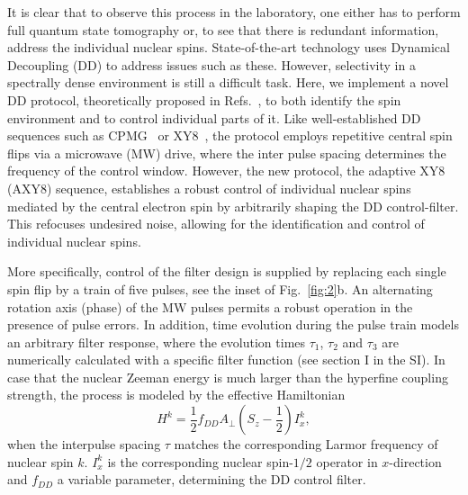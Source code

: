 \documentclass[aps,prl,floatfix,twocolumn,footinbib,superscriptaddress]{revtex4-1}
\begin{document}
It is clear that to observe this process in the laboratory, one either has to perform full quantum state tomography or, to see that there is redundant information, address the individual nuclear spins. State-of-the-art technology uses Dynamical Decoupling (DD) to address issues such as these. However, selectivity in a spectrally dense environment is still a difficult task. Here, we implement a novel DD protocol, theoretically proposed in Refs.~\cite{Cas2015,Cas17}, to both identify the spin environment and to control individual parts of it. Like well-established DD sequences such as CPMG~\cite{MAUDSLEY1986488} or XY8~\cite{gull90}, the protocol employs repetitive central spin flips via a microwave (MW) drive, where the inter pulse spacing determines the frequency of the control window. However, the new protocol, the adaptive XY8 (AXY8) sequence, establishes a robust control of individual nuclear spins mediated by the central electron spin by arbitrarily shaping the DD control-filter. This refocuses undesired noise, allowing for the identification and control of individual nuclear spins. 

More specifically, control of the filter design is supplied by replacing each single spin flip by a train of five pulses, see the inset of Fig.~\ref{fig:2}b. An alternating rotation axis (phase) of the MW pulses permits a robust operation in the presence of pulse errors. In addition, time evolution during the pulse train models an arbitrary filter response, where the evolution times $\tau_1$, $\tau_2$ and $\tau_3$ are numerically calculated with a specific filter function (see section \RN{1} in the SI). In case that the nuclear Zeeman energy is much larger than the hyperfine coupling strength, the process is modeled by the effective Hamiltonian~\cite{Cas2015}
\begin{equation}
H^k = \frac{1}{2}f_{DD}A_\perp \left(S_z -\frac{1}{2}\right) I^k_x,
\label{eq:EM1}
\end{equation}
when the interpulse spacing $\tau$ matches the corresponding Larmor frequency of nuclear spin $k$. $I_x^k$ is the corresponding nuclear spin-$1/2$ operator in $x$-direction and $f_{DD}$ a variable parameter, determining the DD control filter. 
\end{document}
